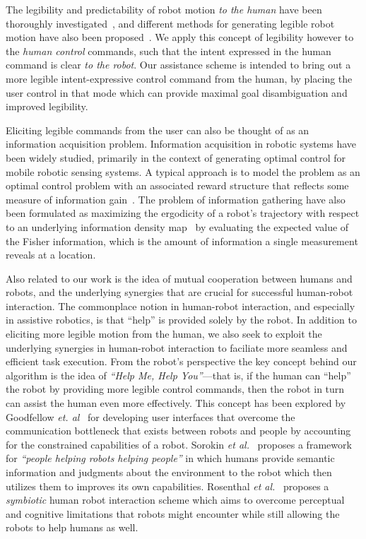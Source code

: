 \documentclass[conference]{IEEEtran}
\begin{document}
The legibility and predictability of robot motion \textit{to the human} have been thoroughly investigated~\cite{dragan2013legibility}, and different methods for generating legible robot motion have also been proposed~\cite{holladay2014legible}. We apply this concept of legibility however to the \textit{human control} commands, such that the intent expressed in the human command is clear \textit{to the robot}. Our assistance scheme is intended to bring out a more legible intent-expressive control command from the human, by placing the user control in that mode which can provide maximal goal disambiguation and improved legibility.

Eliciting legible commands from the user can also be thought of as an information acquisition problem. Information acquisition in robotic systems  have been widely studied, primarily in the context of generating optimal control for mobile robotic sensing systems. A typical approach is to model the problem as an optimal control problem with an associated reward structure that reflects some measure of information gain~\cite{atanasov2014information}. The problem of information gathering have also been formulated as maximizing the ergodicity of a robot's trajectory with respect to an underlying information density map~\cite{miller2013trajectory,miller2016ergodic} by evaluating the expected value of the Fisher information, which is the amount of information a single measurement reveals at a location. 


Also related to our work is the idea of mutual cooperation between humans and robots, and the underlying synergies that are crucial for successful human-robot interaction. The commonplace notion in human-robot interaction, and especially in assistive robotics, is that ``help'' is provided solely by the robot. In addition to eliciting more legible motion from the human, we also seek to exploit the underlying synergies in human-robot interaction to faciliate more seamless and efficient task execution. From the robot's perspective the key concept behind our algorithm is the idea of \textit{``Help Me, Help You''}---that is, if the human can ``help'' the robot by providing more legible control commands, then the robot in turn can assist the human even more effectively. This concept has been explored by Goodfellow \textit{et. al}~\cite{goodfellow2010help} for developing user interfaces that overcome the communication bottleneck that exists between robots and people by accounting for the constrained capabilities of a robot. Sorokin \textit{et al.}~\cite{sorokin2010people} proposes a framework for \textit{``people helping robots helping people''} in which humans provide semantic information and judgments about the environment to the robot which then utilizes them to improves its own capabilities.  Rosenthal \textit{et al.}~\cite{rosenthal2010effective} proposes a \textit{symbiotic} human robot interaction scheme which aims to overcome perceptual and cognitive limitations that robots might encounter while still allowing the robots to help humans as well. 
\end{document}
